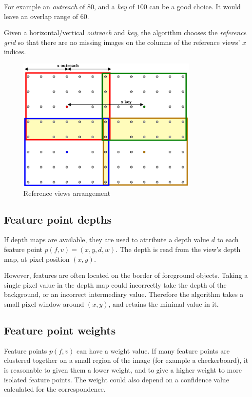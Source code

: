 \documentclass{scrreprt}
\begin{document}
For example an \emph{outreach} of $80$, and a \emph{key} of $100$ can be a good choice. It would leave an overlap range of $60$.

Given a horizontal/vertical \emph{outreach} and \emph{key}, the algorithm chooses the \emph{reference grid} so that there are no missing images on the columns of the reference views' $x$ indices.

\begin{figure}
\centering
\includegraphics[width=0.8\textwidth]{refview.pdf}
\caption{Reference views arrangement}
\label{fig:refview}
\end{figure}


\subsection{Feature point depths}
If depth maps are available, they are used to attribute a depth value $d$ to each feature point $p(f,v) = (x,y,d,w)$. The depth is read from the view's depth map, at pixel position $(x,y)$.

However, features are often located on the border of foreground objects. Taking a single pixel value in the depth map could incorrectly take the depth of the background, or an incorrect intermediary value. Therefore the algorithm takes a small pixel window around $(x,y)$, and retains the minimal value in it.



\subsection{Feature point weights}
Feature points $p(f,v)$ can have a weight value. If many feature points are clustered together on a small region of the image (for example a checkerboard), it is reasonable to given them a lower weight, and to give a higher weight to more isolated feature points. The weight could also depend on a confidence value calculated for the correspondence.
\end{document}
